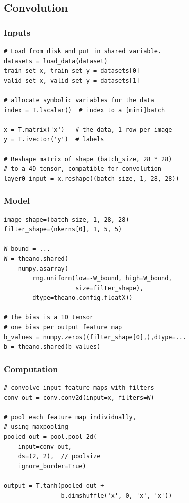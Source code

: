 \documentclass[utf8x,xcolor=pdftex,dvipsnames,table]{beamer}
\begin{document}
\subsection{Convolution}
\begin{frame}
  \tableofcontents[currentsection]
\end{frame}
\begin{frame}[fragile]
  \frametitle{Inputs}
\begin{lstlisting}
# Load from disk and put in shared variable.
datasets = load_data(dataset)
train_set_x, train_set_y = datasets[0]
valid_set_x, valid_set_y = datasets[1]

# allocate symbolic variables for the data
index = T.lscalar()  # index to a [mini]batch

x = T.matrix('x')   # the data, 1 row per image
y = T.ivector('y')  # labels

# Reshape matrix of shape (batch_size, 28 * 28)
# to a 4D tensor, compatible for convolution
layer0_input = x.reshape((batch_size, 1, 28, 28))
\end{lstlisting}
\end{frame}


\begin{frame}[fragile]
  \frametitle{Model}
\begin{lstlisting}
image_shape=(batch_size, 1, 28, 28)
filter_shape=(nkerns[0], 1, 5, 5)

W_bound = ...
W = theano.shared(
    numpy.asarray(
        rng.uniform(low=-W_bound, high=W_bound,
                    size=filter_shape),
        dtype=theano.config.floatX))

# the bias is a 1D tensor
# one bias per output feature map
b_values = numpy.zeros((filter_shape[0],),dtype=...
b = theano.shared(b_values)
\end{lstlisting}
\end{frame}


\begin{frame}[fragile]
  \frametitle{Computation}
\begin{lstlisting}
# convolve input feature maps with filters
conv_out = conv.conv2d(input=x, filters=W)

# pool each feature map individually,
# using maxpooling
pooled_out = pool.pool_2d(
    input=conv_out,
    ds=(2, 2),  // poolsize
    ignore_border=True)

output = T.tanh(pooled_out +
                b.dimshuffle('x', 0, 'x', 'x'))
\end{lstlisting}
\end{frame}
\end{document}
